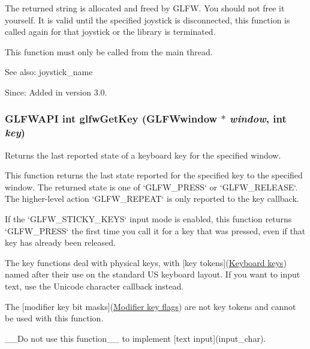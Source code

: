 The returned string is allocated and freed by GLFW. You should not free it yourself. It is valid until the specified joystick is disconnected, this function is called again for that joystick or the library is terminated.

This function must only be called from the main thread.

\begin{Desc}
\item[See also:]joystick\_\-name\end{Desc}
\begin{Desc}
\item[Since:]Added in version 3.0. \end{Desc}
\hypertarget{group__input_g7d8ad8ffaf272808f04e1d5d33ec8859}{
\subsubsection[glfwGetKey]{\setlength{\rightskip}{0pt plus 5cm}GLFWAPI int glfwGetKey ({\bf GLFWwindow} $\ast$ {\em window}, \/  int {\em key})}}
\label{group__input_g7d8ad8ffaf272808f04e1d5d33ec8859}


Returns the last reported state of a keyboard key for the specified window. 

This function returns the last state reported for the specified key to the specified window. The returned state is one of `GLFW\_\-PRESS` or `GLFW\_\-RELEASE`. The higher-level action `GLFW\_\-REPEAT` is only reported to the key callback.

If the `GLFW\_\-STICKY\_\-KEYS` input mode is enabled, this function returns `GLFW\_\-PRESS` the first time you call it for a key that was pressed, even if that key has already been released.

The key functions deal with physical keys, with \mbox{[}key tokens\mbox{]}(\hyperlink{group__keys}{Keyboard keys}) named after their use on the standard US keyboard layout. If you want to input text, use the Unicode character callback instead.

The \mbox{[}modifier key bit masks\mbox{]}(\hyperlink{group__mods}{Modifier key flags}) are not key tokens and cannot be used with this function.

\_\-\_\-Do not use this function\_\-\_\- to implement \mbox{[}text input\mbox{]}(input\_\-char).

